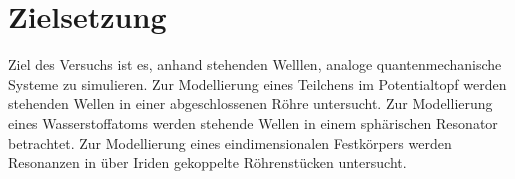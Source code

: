 \section{Zielsetzung}
\label{sec:Zielsetzung}

Ziel des Versuchs ist es, anhand stehenden Welllen, analoge quantenmechanische Systeme zu simulieren.
Zur Modellierung eines Teilchens im Potentialtopf werden stehenden Wellen in einer abgeschlossenen Röhre untersucht.
Zur Modellierung eines Wasserstoffatoms werden stehende Wellen in einem sphärischen Resonator betrachtet.
Zur Modellierung eines eindimensionalen Festkörpers werden Resonanzen in über Iriden gekoppelte Röhrenstücken untersucht.